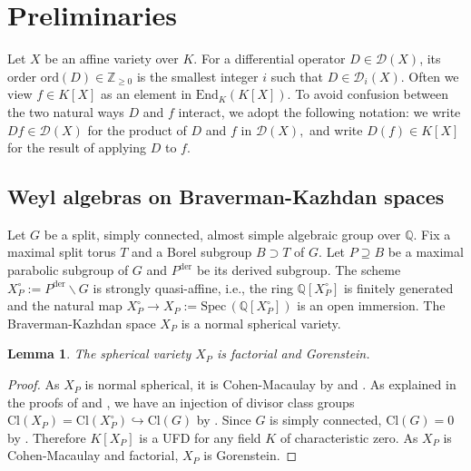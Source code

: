 \documentclass[11pt,a4paper,usenames,dvipsnames,reqno]{amsart}
\numberwithin{equation}{section}
\newcommand{\zz}{\mathbb Z}
\newcommand{\qq}{\mathbb Q}
\newtheorem{Lem}[Thm]{Lemma}
\theoremstyle{definition}
\theoremstyle{remark}
\begin{document}
\section{Preliminaries}\label{sec:review}

Let $X$ be an affine variety over $K$. For a differential operator $D\in \mathcal{D}(X)$, its order $\mathrm{ord}(D)\in \zz_{\ge 0}$ is the smallest integer $i$ such that $D\in \mathcal{D}_{i}(X).$ Often we view $f\in K[X]$ as an element in $\mathrm{End}_K(K[X])$. To avoid confusion between the two natural ways $D$ and $f$ interact, we adopt the following notation: we write $Df\in \mathcal{D}(X)$ for the product of $D$ and $f$ in $\mathcal{D}(X),$ and write $D(f)\in K[X]$ for the result of applying $D$ to $f.$

\subsection{Weyl algebras on Braverman-Kazhdan spaces}

Let $G$ be a split, simply connected, almost simple algebraic group over $\qq$. Fix a maximal split torus $T$ and a Borel subgroup $B\supset T$ of $G$. Let $P\supseteq B$ be a maximal parabolic subgroup of $G$ and $P^{\mathrm{der}}$ be its derived subgroup. The scheme $X_P^\circ:=P^{\mathrm{der}}\backslash G$ is strongly quasi-affine, i.e., the ring $\qq[X_P^\circ]$ is finitely generated and the natural map $X_P^\circ\longrightarrow X_P:=\mathrm{Spec}\, (\qq[X_P^\circ])$ is an open immersion. The Braverman-Kazhdan space $X_P$ is a normal spherical variety.

\begin{Lem}\label{lem:XP}
    The spherical variety $X_P$ is factorial and Gorenstein.
\end{Lem}

\begin{proof}
      As $X_P$ is normal spherical, it is Cohen-Macaulay by \cite[Corollary 2.3.4]{Geometryofspherical} and \cite[\href{https://stacks.math.columbia.edu/tag/045P}{Tag 045P}]{stacks-project}. As explained in the proofs of \cite[Lemma 3.2]{Gannon:GKconjecture} and \cite[Corollary 1.3]{FuLiu}, we have an injection of divisor class groups $\mathrm{Cl}(X_P)=\mathrm{Cl}(X_P^\circ)\hookrightarrow \mathrm{Cl}(G)$ by \cite[Theorem 18.32]{Milne:AGbook}. Since $G$ is simply connected, $\mathrm{Cl}(G)=0$ by \cite[Corollary 18.24]{Milne:AGbook}. Therefore $K[X_P]$ is a UFD for any field $K$ of characteristic zero. As $X_P$ is Cohen-Macaulay and factorial, $X_P$ is Gorenstein.
\end{proof}
\end{document}
